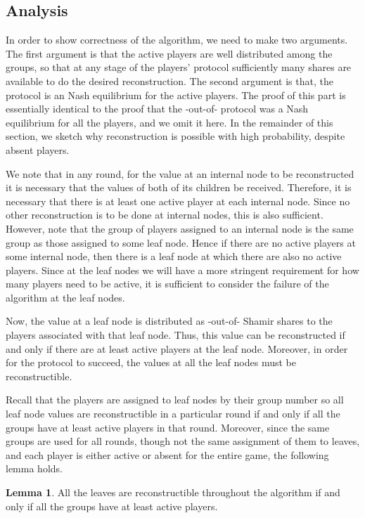 \documentclass[12pt]{article}
\theoremstyle{definition}
\newtheorem{lemma}[theorem]{Lemma}
\begin{document}
\subsection{Analysis}

In order to show correctness of the algorithm, we need to make two
arguments. The first argument is that the active players are well
distributed among the groups, so that at any 
stage of the players' protocol
sufficiently many shares are available to do the desired
reconstruction. The second argument is that, the protocol is an
Nash equilibrium for the active players. The proof of this
part is essentially identical to the proof that the -out-of-
protocol was a Nash equilibrium for all the players, and
we omit it here. In the remainder of this section, we sketch why
reconstruction is possible with high probability, despite absent
players.

We note that in any round, for the value at an internal node to be 
reconstructed it is necessary that the values of both of its children be
received. Therefore, it is necessary that there is at least one active
player at each internal node.  Since no other reconstruction is to be
done at internal nodes, this is also sufficient. However, note that
the group of  players assigned to an internal node is the
same group as those assigned to some leaf node. Hence if there are no
active players at some internal node, then there is a leaf node at
which there are also no active players. Since at the leaf nodes we
will have a more stringent requirement for how many players need to be
active, it is sufficient to consider the failure of the algorithm at
the leaf nodes.

Now, the value at a leaf node is distributed as -out-of- Shamir shares to the  players associated
with that leaf node. Thus, this value can be reconstructed if and only
if there are at least  active players at the leaf
node. Moreover, in order for the protocol to succeed, the values at
all the leaf nodes must be reconstructible.

Recall that the players are assigned to leaf nodes by their group number 
so all leaf node values are reconstructible in a particular round if and 
only if all the groups 
have  at least  active players in that round. Moreover, 
since the same groups are used for all rounds, though not the same 
assignment of them to leaves, and each player is either active or absent for 
the entire game, the following lemma holds.
\begin{lemma}\label{lem:lriffg}
All the leaves are reconstructible throughout the algorithm if and only if 
all the groups have  at least  active players.
\end{lemma}
\end{document}
